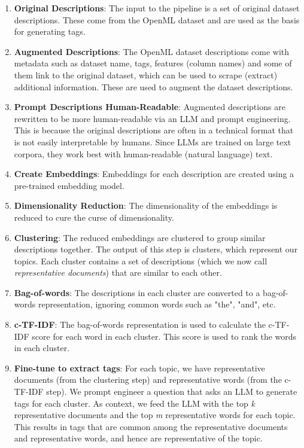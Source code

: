 \begin{enumerate}
    \item \textbf{Original Descriptions}: The input to the pipeline is a set of original dataset descriptions. These come from the OpenML dataset and are used as the basis for generating tags.
    \item \textbf{Augmented Descriptions}: The OpenML dataset descriptions come with metadata such as dataset name, tags, features (column names) and some of them link to the original dataset, which can be used to scrape (extract) additional information. These are used to augment the dataset descriptions.
    \item \textbf{Prompt Descriptions Human-Readable}: Augmented descriptions are rewritten to be more human-readable via an LLM and prompt engineering. This is because the original descriptions are often in a technical format that is not easily interpretable by humans. Since LLMs are trained on large text corpora, they work best with human-readable (natural language) text.
    \item \textbf{Create Embeddings}: Embeddings for each description are created using a pre-trained embedding model.
    \item \textbf{Dimensionality Reduction}: The dimensionality of the embeddings is reduced to cure the curse of dimensionality.
    \item \textbf{Clustering}: The reduced embeddings are clustered to group similar descriptions together. The output of this step is clusters, which represent our topics. Each cluster contains a set of descriptions (which we now call \textit{representative documents}) that are similar to each other.
    \item \textbf{Bag-of-words}: The descriptions in each cluster are converted to a bag-of-words representation, ignoring common words such as "the", "and", etc.
    \item \textbf{c-TF-IDF}: The bag-of-words representation is used to calculate the c-TF-IDF score for each word in each cluster. This score is used to rank the words in each cluster.
    \item \textbf{Fine-tune to extract tags}: For each topic, we have representative documents (from the clustering step) and representative words (from the c-TF-IDF step). We prompt engineer a question that asks an LLM to generate tags for each cluster. As context, we feed the LLM with the top \textit{k} representative documents and the top \textit{m} representative words for each topic. This results in tags that are common among the representative documents and representative words, and hence are representative of the topic.

\end{enumerate}
